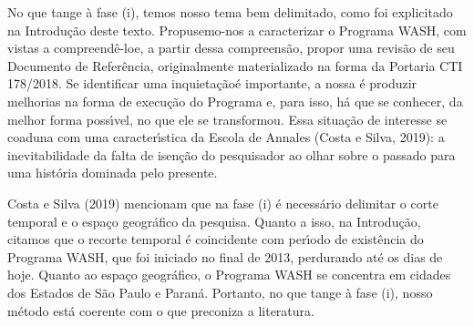 \documentclass[
12pt,		%
openright,	%
twoside,  %
a4paper,			%
chapter=TITLE,		%
english,			%
french,				%
spanish,			%
brazil				%
]{USPSC-classe/USPSC}
\begin{document}
No que tange \`a fase (i), temos nosso tema bem delimitado, como foi explicitado na Introdu\c{c}\~ao deste texto. Propusemo-nos a caracterizar o Programa WASH, com vistas a \textquotedbl compreend\^e-lo\textquotedbl  e, a partir dessa compreens\~ao, propor uma revis\~ao de seu Documento de Refer\^encia, originalmente materializado na forma da Portaria CTI 178/2018. Se \textquotedbl identificar uma inquieta\c{c}\~ao\textquotedbl  \'e importante, a nossa \'e produzir melhorias na forma de execu\c{c}\~ao do Programa e, para isso, h\'a que se conhecer, da melhor forma poss\'{\i}vel, no que ele se transformou. Essa situa\c{c}\~ao de \textquotedbl interesse \textquotedbl  se coaduna com uma caracter\'{\i}stica da Escola de Annales  (Costa e Silva, 2019): \textquotedbl a inevitabilidade da falta de isen\c{c}\~ao do pesquisador ao olhar sobre o passado para uma hist\'oria dominada pelo presente.\textquotedbl 

















Costa e Silva (2019) mencionam que na fase (i) \'e necess\'ario delimitar o \textquotedbl corte temporal \textquotedbl  e o \textquotedbl espa\c{c}o geogr\'afico \textquotedbl  da pesquisa.  Quanto a isso, na Introdu\c{c}\~ao, citamos que o recorte temporal \'e coincidente com per\'{\i}odo de exist\^encia do Programa WASH, que foi iniciado no final de 2013, perdurando at\'e os dias de hoje. Quanto ao espa\c{c}o geogr\'afico, o Programa WASH se concentra em cidades dos Estados de S\~ao Paulo e Paran\'a. Portanto, no que tange \`a fase (i), nosso m\'etodo est\'a coerente com o que preconiza a literatura.
\end{document}
